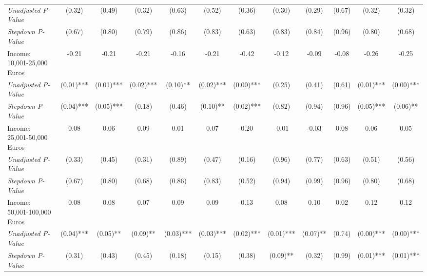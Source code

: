 \begin{tabular}{l c c c c c c c c c c c}
\quad \textit{Unadjusted P-Value} & (0.32) & (0.49) & (0.32) & (0.63) & (0.52) & (0.36) & (0.30) & (0.29) & (0.67) & (0.32) & (0.32) \\
\quad \textit{Stepdown P-Value} & (0.67) & (0.80) & (0.79) & (0.86) & (0.83) & (0.63) & (0.83) & (0.84) & (0.96) & (0.80) & (0.68) \\
Income: 10,001-25,000 Euros & -0.21 & -0.21 & -0.21 & -0.16 & -0.21 & -0.42 & -0.12 & -0.09 & -0.08 & -0.26 & -0.25 \\
\quad \textit{Unadjusted P-Value} & (0.01)*** & (0.01)*** & (0.02)*** & (0.10)** & (0.02)*** & (0.00)*** & (0.25) & (0.41) & (0.61) & (0.01)*** & (0.00)*** \\
\quad \textit{Stepdown P-Value} & (0.04)*** & (0.05)*** & (0.18) & (0.46) & (0.10)** & (0.02)*** & (0.82) & (0.94) & (0.96) & (0.05)*** & (0.06)** \\
Income: 25,001-50,000 Euros & 0.08 & 0.06 & 0.09 & 0.01 & 0.07 & 0.20 & -0.01 & -0.03 & 0.08 & 0.06 & 0.05 \\
\quad \textit{Unadjusted P-Value} & (0.33) & (0.45) & (0.31) & (0.89) & (0.47) & (0.16) & (0.96) & (0.77) & (0.63) & (0.51) & (0.56) \\
\quad \textit{Stepdown P-Value} & (0.67) & (0.80) & (0.68) & (0.86) & (0.83) & (0.52) & (0.94) & (0.99) & (0.96) & (0.80) & (0.68) \\
Income: 50,001-100,000 Euros & 0.08 & 0.08 & 0.07 & 0.09 & 0.09 & 0.13 & 0.08 & 0.10 & 0.02 & 0.12 & 0.12 \\
\quad \textit{Unadjusted P-Value} & (0.04)*** & (0.05)** & (0.09)** & (0.03)*** & (0.03)*** & (0.02)*** & (0.01)*** & (0.07)** & (0.74) & (0.00)*** & (0.00)*** \\
\quad \textit{Stepdown P-Value} & (0.31) & (0.43) & (0.45) & (0.18) & (0.15) & (0.38) & (0.09)** & (0.32) & (0.99) & (0.01)*** & (0.01)*** \\
\bottomrule
\end{tabular}
